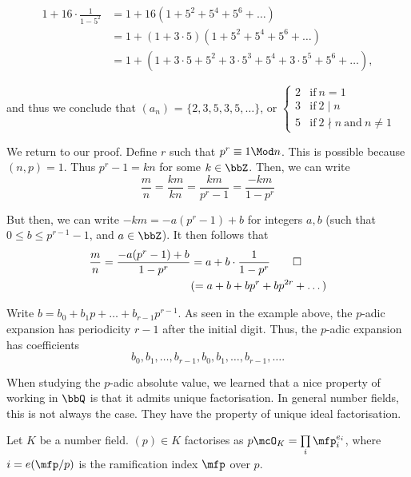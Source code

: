 \documentclass[a4paper, 12pt,oneside,openany]{book}
\begin{document}
\begin{align*}
	1+16\cdot\frac{1}{1-5^2} &= 1+16(1+5^2+5^4+5^6+\dots)\\
	&= 1+(1+3\cdot5)(1+5^2+5^4+5^6+\dots)\\
	&= 1+(1+3\cdot 5+5^2+3\cdot 5^3+5^4+3\cdot 5^5+5^6+\dots),
\end{align*}

and thus we conclude that $(a_n)$ = $\{2, 3, 5, 3, 5, \dots\}$, or $\begin{cases} 2 &\text{if}\ n=1 \\ 3 &\text{if}\ 2\mid n \\  5 &\text{if}\ 2\nmid n\ \text{and}\ n\neq1  \end{cases}$

We return to our proof. Define $r$ such that $p^r \equiv 1 \Mod n$. This is possible because $(n, p)=1$. Thus $p^r-1 = kn$ for some $k\in\bbZ$. Then, we can write $$\frac{m}{n}=\frac{km}{kn}=\frac{km}{p^r-1}=\frac{-km}{1-p^r}$$ 

But then, we can write $-km=-a(p^r-1)+b$ for integers $a, b$ (such that $0\leq b \leq p^{r-1}-1$, and $a\in\bbZ$). It then follows that \begin{align*} \frac{m}{n}=\frac{-a(p^r-1)+b}{1-p^r}&=a+b\cdot\frac{1}{1-p^r} \qed \\ &(= a+b+bp^r+bp^{2r}+\dots ) \end{align*}

Write $b=b_0+b_1p+\dots+b_{r-1}p^{r-1}$. As seen in the example above, the $p$-adic expansion has periodicity $r-1$ after the initial digit. Thus, the $p$-adic expansion has coefficients $$b_0, b_1, \dots, b_{r-1}, b_0, b_1, \dots, b_{r-1}, \dots.$$

When studying the $p$-adic absolute value, we learned that a nice property of working in $\bbQ$ is that it admits unique factorisation. In general number fields, this is not always the case. They have the property of unique ideal factorisation. 

Let $K$ be a number field. $(p)\in K$ factorises as $p\mcO_K=\prod\limits_{i} \mfp_i^{e_i}$, where $i=e(\mfp/p)$ is the ramification index $\mfp$ over $p$.

\end{document}
